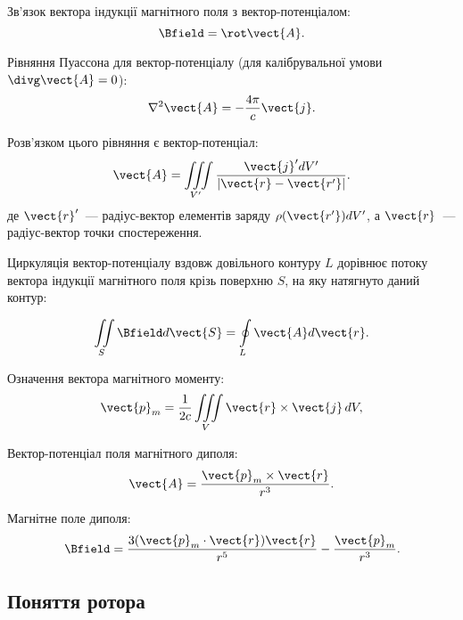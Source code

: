 \begin{Theory}\small
  Зв'язок вектора індукції магнітного поля з вектор-потенціалом:
  \begin{equation}\label{BrotA}
	  \Bfield = \rot\vect{A}.
  \end{equation}

  Рівняння Пуассона для вектор-потенціалу (для калібрувальної умови $\divg\vect{A} = 0$):
  \begin{equation}
	  \nabla^2\vect{A} = - \frac{4\pi}{c}\vect{j}.
  \end{equation}

  Розв'язком цього рівняння є вектор-потенціал:
  \begin{equation}\label{Supperposition_principle}
	  \vect{A}  = \iiint\limits_{V'} \frac{\vect{j}' dV'}{\left| \vect{r} - \vect{r'} \right|}.
  \end{equation}
  де $\vect{r}'$~--- радіус-вектор елементів заряду $\rho(\vect{r'}) dV'$, а $\vect{r}$~--- радіус-вектор точки спостереження.

	Циркуляція вектор-потенціалу вздовж довільного контуру $L$ дорівнює потоку вектора індукції магнітного поля крізь поверхню $S$, на яку натягнуто даний контур:

  \begin{equation}\label{Bflux_is_circulating_potential}
	  \iint\limits_S \Bfield d\vect{S} = \oint\limits_L \vect{A} d\vect{r}.
  \end{equation}

  Означення вектора магнітного моменту:
  \begin{equation}\label{mag_momentum}
	  \vect{p}_m = \frac{1}{2c} \iiint\limits_V \vect{r}\times\vect{j}\,dV,
  \end{equation}

  Вектор-потенціал поля магнітного диполя:
  \begin{equation}\label{dipole_vect_potential}
	  \vect{A} = \frac{\vect{p}_m\times \vect{r} }{r^3}.
  \end{equation}

  Магнітне поле диполя:
  \begin{equation}\label{dipole_Bfield}
	  \Bfield = \frac{3(\vect{p}_m\cdot\vect{r})\vect{r}}{r^5} - \frac{\vect{p}_m}{r^3}.
  \end{equation}
\end{Theory}

\subsection*{Поняття ротора}

